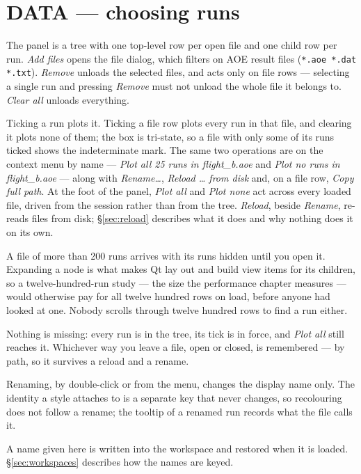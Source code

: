 \documentclass[11pt,a4paper,oneside]{report}
\newcommand{\code}[1]{\texttt{#1}}
\begin{document}
\section{DATA --- choosing runs}
\label{sec:data}

The panel is a tree with one top-level row per open file and one child row per
run. \emph{Add files} opens the file dialog, which filters on AOE result files
(\code{*.aoe *.dat *.txt}). \emph{Remove} unloads the selected files, and acts
only on file rows --- selecting a single run and pressing \emph{Remove} must not
unload the whole file it belongs to. \emph{Clear all} unloads everything.

Ticking a run plots it. Ticking a file row plots every run in that file, and
clearing it plots none of them; the box is tri-state, so a file with only some of
its runs ticked shows the indeterminate mark. The same two operations are on the
context menu by name --- \emph{Plot all 25 runs in flight\_b.aoe} and \emph{Plot
no runs in flight\_b.aoe} --- along with \emph{Rename\ldots}, \emph{Reload
\ldots{} from disk} and, on a file row, \emph{Copy full path}. At the foot of
the panel, \emph{Plot all} and \emph{Plot none} act across every loaded file,
driven from the session rather than from the tree. \emph{Reload}, beside
\emph{Rename}, re-reads files from disk; \S\ref{sec:reload} describes what it
does and why nothing does it on its own.

A file of more than 200 runs arrives with its runs hidden until you open it.
Expanding a node is what makes Qt lay out and build view items for its children,
so a twelve-hundred-run study --- the size the performance chapter measures ---
would otherwise pay for all twelve hundred rows on load, before anyone had
looked at one. Nobody scrolls through twelve hundred rows to find a run either.

Nothing is missing: every run is in the tree, its tick is in force, and
\emph{Plot all} still reaches it. Whichever way you leave a file, open or
closed, is remembered --- by path, so it survives a reload and a rename.

Renaming, by double-click or from the menu, changes the display name only. The
identity a style attaches to is a separate key that never changes, so
recolouring does not follow a rename; the tooltip of a renamed run records what
the file calls it.

A name given here is written into the workspace and restored when it is loaded.
\S\ref{sec:workspaces} describes how the names are keyed.
\end{document}
